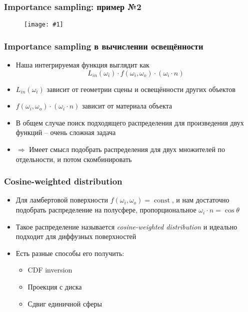 \documentclass[10pt]{beamer}
\newcommand{\slideimage}[1]{
  \begin{figure}
    \begin{adjustbox}{width=\textwidth, totalheight=\textheight-2\baselineskip-2\baselineskip,keepaspectratio}
      \texttt{[image: \#1]}
    \end{adjustbox}
  \end{figure}
}
\begin{document}
\begin{frame}
\frametitle{Importance sampling: пример №2}
\slideimage{is_plot_2.png}
\end{frame}

\begin{frame}
\frametitle{Importance sampling в вычислении освещённости}
\begin{itemize}
\item Наша интегрируемая функция выглядит как
\begin{equation*}
L_{in}(\omega_i) \cdot f(\omega_i, \omega_o) \cdot (\omega_i \cdot n)
\end{equation*}
\pause
\item \begin{math}L_{in}(\omega_i)\end{math} зависит от геометрии сцены и освещённости других объектов
\pause
\item \begin{math}f(\omega_i, \omega_o) \cdot (\omega_i \cdot n)\end{math} зависит от материала объекта
\pause
\item В общем случае поиск подходящего распределения для произведения двух функций -- очень сложная задача
\pause
\item \begin{math}\Longrightarrow\end{math} Имеет смысл подобрать распределения для двух множителей по отдельности, и потом скомбинировать
\end{itemize}
\end{frame}

\begin{frame}
\frametitle{Cosine-weighted distribution}
\begin{itemize}
\item Для ламбертовой поверхности \begin{math}f(\omega_i, \omega_o) = \operatorname{const}\end{math}, и нам достаточно подобрать распределение на полусфере, пропорциональное \begin{math}\omega_i \cdot n=\cos \theta\end{math}
\pause
\item Такое распределение называется \textit{cosine-weighted distribution} и идеально подходит для диффузных поверхностей
\pause
\item Есть разные способы его получить:
\pause
\begin{itemize}
\item CDF inversion
\item Проекция с диска
\item Сдвиг единичной сферы
\end{itemize}
\end{itemize}
\end{frame}
\end{document}
